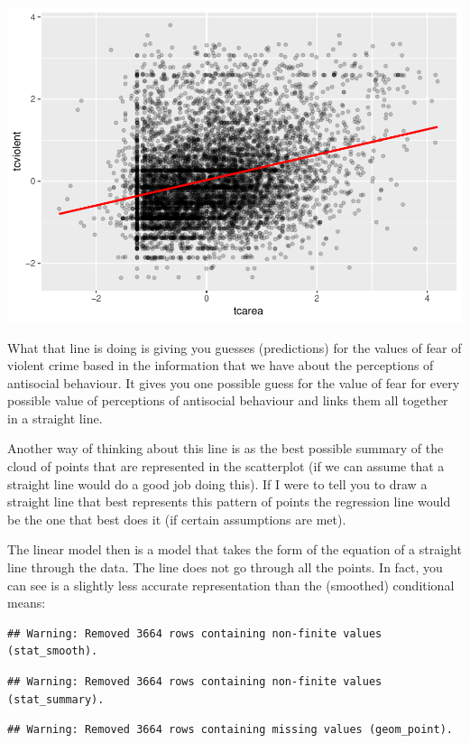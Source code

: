 \documentclass[]{book}
\theoremstyle{definition}
\theoremstyle{definition}
\theoremstyle{definition}
\theoremstyle{remark}
\begin{document}
\includegraphics{08-regression_files/figure-latex/unnamed-chunk-7-1.pdf}

What that line is doing is giving you guesses (predictions) for the
values of fear of violent crime based in the information that we have
about the perceptions of antisocial behaviour. It gives you one possible
guess for the value of fear for every possible value of perceptions of
antisocial behaviour and links them all together in a straight line.

Another way of thinking about this line is as the best possible summary
of the cloud of points that are represented in the scatterplot (if we
can assume that a straight line would do a good job doing this). If I
were to tell you to draw a straight line that best represents this
pattern of points the regression line would be the one that best does it
(if certain assumptions are met).

The linear model then is a model that takes the form of the equation of
a straight line through the data. The line does not go through all the
points. In fact, you can see is a slightly less accurate representation
than the (smoothed) conditional means:

\begin{verbatim}
## Warning: Removed 3664 rows containing non-finite values (stat_smooth).
\end{verbatim}

\begin{verbatim}
## Warning: Removed 3664 rows containing non-finite values (stat_summary).
\end{verbatim}

\begin{verbatim}
## Warning: Removed 3664 rows containing missing values (geom_point).
\end{verbatim}
\end{document}
